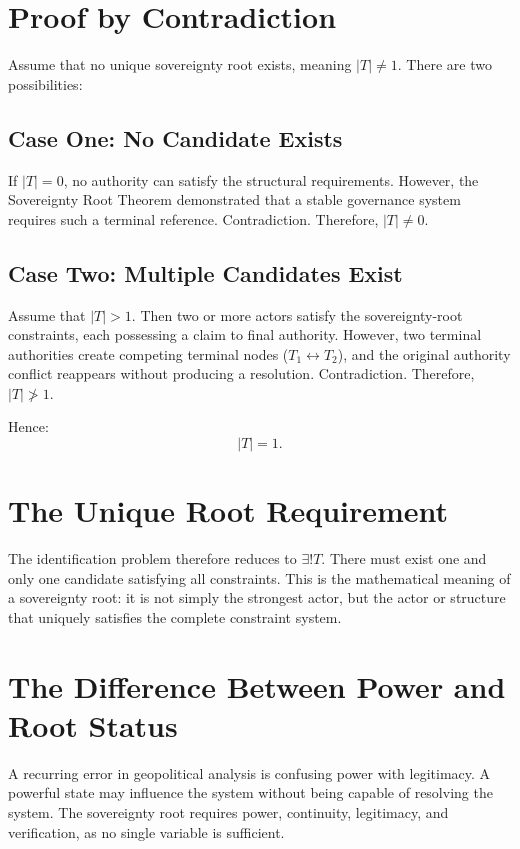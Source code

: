 \documentclass[11pt,openany]{book}
\theoremstyle{plain}
\theoremstyle{definition}
\begin{document}
\section*{Proof by Contradiction}

Assume that no unique sovereignty root exists, meaning \(|T| \neq 1\). There are two possibilities:

\subsection*{Case One: No Candidate Exists}

If \(|T| = 0\), no authority can satisfy the structural requirements. However, the Sovereignty Root Theorem demonstrated that a stable governance system requires such a terminal reference. Contradiction. Therefore, \(|T| \neq 0\).

\subsection*{Case Two: Multiple Candidates Exist}

Assume that \(|T| > 1\). Then two or more actors satisfy the sovereignty-root constraints, each possessing a claim to final authority. However, two terminal authorities create competing terminal nodes (\(T_1 \leftrightarrow T_2\)), and the original authority conflict reappears without producing a resolution. Contradiction. Therefore, \(|T| \ngtr 1\).

Hence:
\[
\boxed{
|T| = 1.
}
\]

\section*{The Unique Root Requirement}

The identification problem therefore reduces to \(\exists ! T\). There must exist one and only one candidate satisfying all constraints. This is the mathematical meaning of a sovereignty root: it is not simply the strongest actor, but the actor or structure that uniquely satisfies the complete constraint system.

\section*{The Difference Between Power and Root Status}

A recurring error in geopolitical analysis is confusing power with legitimacy. A powerful state may influence the system without being capable of resolving the system. The sovereignty root requires power, continuity, legitimacy, and verification, as no single variable is sufficient.
\end{document}
